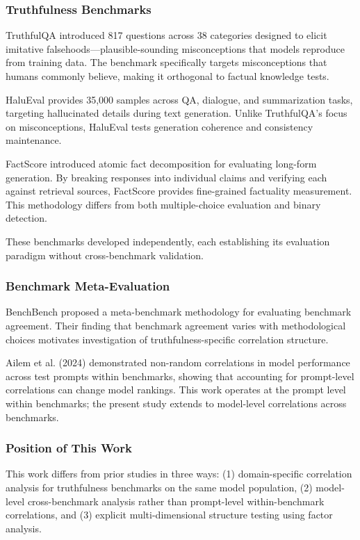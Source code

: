 
\subsubsection{Truthfulness Benchmarks}

TruthfulQA \citep{lin2022truthfulqa} introduced 817 questions across 38 categories designed to elicit imitative falsehoods---plausible-sounding misconceptions that models reproduce from training data. The benchmark specifically targets misconceptions that humans commonly believe, making it orthogonal to factual knowledge tests.

HaluEval \citep{li2023halueval} provides 35,000 samples across QA, dialogue, and summarization tasks, targeting hallucinated details during text generation. Unlike TruthfulQA's focus on misconceptions, HaluEval tests generation coherence and consistency maintenance.

FactScore \citep{min2023factscore} introduced atomic fact decomposition for evaluating long-form generation. By breaking responses into individual claims and verifying each against retrieval sources, FactScore provides fine-grained factuality measurement. This methodology differs from both multiple-choice evaluation and binary detection.

These benchmarks developed independently, each establishing its evaluation paradigm without cross-benchmark validation.

\subsubsection{Benchmark Meta-Evaluation}

BenchBench \citep{perlitz2024benchbench} proposed a meta-benchmark methodology for evaluating benchmark agreement. Their finding that benchmark agreement varies with methodological choices motivates investigation of truthfulness-specific correlation structure.

Ailem et al. (2024) demonstrated non-random correlations in model performance across test prompts within benchmarks, showing that accounting for prompt-level correlations can change model rankings. This work operates at the prompt level within benchmarks; the present study extends to model-level correlations across benchmarks.

\subsubsection{Position of This Work}

This work differs from prior studies in three ways: (1) domain-specific correlation analysis for truthfulness benchmarks on the same model population, (2) model-level cross-benchmark analysis rather than prompt-level within-benchmark correlations, and (3) explicit multi-dimensional structure testing using factor analysis.
